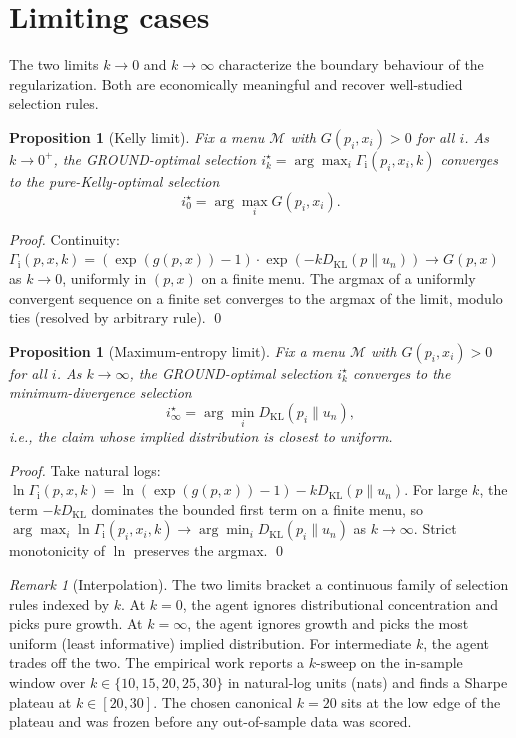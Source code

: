 \documentclass[11pt]{article}
\newtheorem{proposition}[theorem]{Proposition}
\theoremstyle{definition}
\theoremstyle{remark}
\newtheorem{remark}[theorem]{Remark}
\newcommand{\G}{g}
\newcommand{\KL}{D_{\mathrm{KL}}}
\newcommand{\GROUND}{\Gamma_{\mathrm{i}}}
\begin{document}
\section{Limiting cases}\label{sec:limits}

The two limits $k \to 0$ and $k \to \infty$ characterize the boundary
behaviour of the regularization. Both are economically meaningful and
recover well-studied selection rules.

\begin{proposition}[Kelly limit]\label{prop:kelly-limit}
Fix a menu $\mathcal{M}$ with $G(p_i, x_i) > 0$ for all $i$. As
$k \to 0^+$, the GROUND-optimal selection $i^\star_k = \arg\max_i
\GROUND(p_i, x_i, k)$ converges to the pure-Kelly-optimal selection
\begin{equation*}
i^\star_0 = \arg\max_i G(p_i, x_i).
\end{equation*}
\end{proposition}

\begin{proof}
Continuity: $\GROUND(p, x, k) = (\exp(\G(p, x)) - 1) \cdot \exp(-k \KL(p\|u_n))
\to G(p, x)$ as $k \to 0$, uniformly in $(p, x)$ on a finite menu.
The argmax of a uniformly convergent sequence on a finite set
converges to the argmax of the limit, modulo ties (resolved by
arbitrary rule).
\qed
\end{proof}

\begin{proposition}[Maximum-entropy limit]\label{prop:maxent-limit}
Fix a menu $\mathcal{M}$ with $G(p_i, x_i) > 0$ for all $i$. As
$k \to \infty$, the GROUND-optimal selection $i^\star_k$ converges to
the minimum-divergence selection
\begin{equation*}
i^\star_\infty = \arg\min_i \KL(p_i \| u_n),
\end{equation*}
i.e., the claim whose implied distribution is closest to uniform.
\end{proposition}

\begin{proof}
Take natural logs: $\ln \GROUND(p, x, k) = \ln(\exp(\G(p,x)) - 1) - k \KL(p \| u_n)$.
For large $k$, the term $-k \KL$ dominates the bounded first term on
a finite menu, so $\arg\max_i \ln \GROUND(p_i, x_i, k) \to \arg\min_i
\KL(p_i \| u_n)$ as $k \to \infty$. Strict monotonicity of $\ln$
preserves the argmax. \qed
\end{proof}

\begin{remark}[Interpolation]
\label{rem:interpolation}
The two limits bracket a continuous family of selection rules indexed
by $k$. At $k = 0$, the agent ignores distributional concentration and
picks pure growth. At $k = \infty$, the agent ignores growth and picks
the most uniform (least informative) implied distribution. For
intermediate $k$, the agent trades off the two. The empirical work
\citep{mercurio2026empirical} reports a $k$-sweep on the in-sample
window over $k \in \{10, 15, 20, 25, 30\}$ in natural-log units (nats)
and finds a Sharpe plateau at $k \in [20, 30]$. The chosen canonical
$k = 20$ sits at the low edge of the plateau and was frozen before
any out-of-sample data was scored.
\end{remark}
\end{document}
